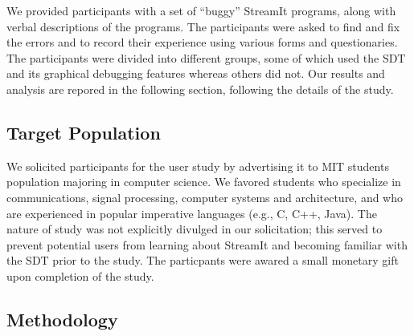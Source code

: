 \documentclass[11pt, letterpaper, onecolumn]{article}
\begin{document}
We provided  participants with a  set of ``buggy''  StreamIt programs,
along with verbal descriptions of the programs.  The participants were
asked to find and fix the  errors and to record their experience using
various forms  and questionaries.  The participants  were divided into
different  groups,  some of  which  used  the  SDT and  its  graphical
debugging features  whereas others did not.  Our  results and analysis
are repored  in the  following section, following  the details  of the
study.


\subsection{Target Population}

We solicited participants for the  user study by advertising it to MIT
students population majoring in  computer science. We favored students
who specialize in  communications, signal processing, computer systems
and  architecture,  and  who  are experienced  in  popular  imperative
languages  (e.g.,  C,  C++,  Java).   The  nature  of  study  was  not
explicitly  divulged  in  our  solicitation; this  served  to  prevent
potential  users from  learning about  StreamIt and  becoming familiar
with the SDT  prior to the study. The particpants  were awared a small
monetary gift upon completion of the study.


\subsection{Methodology}
\end{document}
